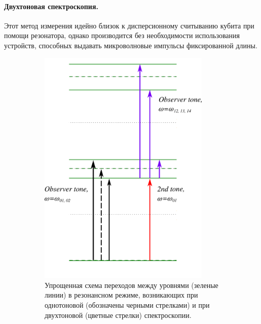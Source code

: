 \documentclass[12pt, twoside]{report}
\numberwithin{equation}{section}
\numberwithin{figure}{section}
\begin{document}
\paragraph{Двухтоновая спектроскопия.} Этот метод измерения идейно близок к дисперсионному считыванию кубита при помощи резонатора, однако производится без необходимости использования устройств, способных выдавать микроволновые импульсы фиксированной длины.
\begin{figure}[h!]
\captionsetup[subfigure]{justification=normal, width = 0.9\textwidth}
\centering
\begin{subfigure}[b]{0.35\textwidth}
\centering
\includegraphics[width=0.9\textwidth]{Pictures/2tone}
\caption{Упрощенная схема переходов между уровнями (зеленые линии) в резонансном режиме, возникающих при однотоновой (обозначены черными стрелками) и при двухтоновой (цветные стрелки) спектроскопии.}
\end{subfigure}
\begin{subfigure}[b]{0.6\textwidth}
\centering

\end{subfigure}
\end{figure}
\end{document}

